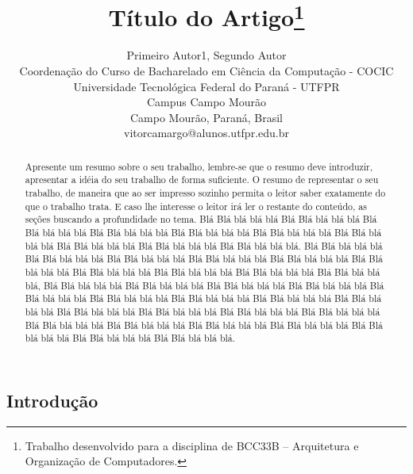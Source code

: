 \documentclass[times, 10pt,twocolumn]{article}
\begin{document}
\begin{savenotes}
\title{Título do Artigo\footnote{Trabalho desenvolvido para a disciplina de BCC33B – Arquitetura e Organização de Computadores.}}


\author{Primeiro Autor1, Segundo Autor\\
Coordenação do Curso de Bacharelado em Ciência da Computação - COCIC\\
Universidade Tecnológica Federal do Paraná - UTFPR\\ 
Campus Campo Mourão\\
Campo Mourão, Paraná, Brasil\\
vitorcamargo@alunos.utfpr.edu.br\\
}

\maketitle
\thispagestyle{empty}

\begin{abstract}
   Apresente um resumo sobre o seu trabalho, lembre-se que o resumo deve introduzir, apresentar a idéia do seu trabalho de forma suficiente. O resumo de representar o seu trabalho, de maneira que ao ser impresso sozinho permita o leitor saber exatamente do que o trabalho trata. E caso lhe interesse o leitor irá ler o restante do conteúdo, as seções buscando a profundidade no tema.
   Blá Blá blá blá blá Blá Blá blá blá blá Blá Blá blá blá blá Blá Blá blá blá blá Blá Blá blá blá blá Blá Blá blá blá blá Blá Blá blá blá blá Blá Blá blá blá blá Blá Blá blá blá blá Blá Blá blá blá blá. Blá Blá blá blá blá Blá Blá blá blá blá Blá Blá blá blá blá Blá Blá blá blá blá Blá Blá blá blá blá Blá Blá blá blá blá Blá Blá blá blá blá Blá Blá blá blá blá Blá Blá blá blá blá Blá Blá blá blá blá, Blá Blá blá blá blá Blá Blá blá blá blá Blá Blá blá blá blá Blá Blá blá blá blá Blá Blá blá blá blá Blá Blá blá blá blá Blá Blá blá blá blá Blá Blá blá blá blá Blá Blá blá blá blá Blá Blá blá blá blá Blá Blá blá blá blá Blá Blá blá blá blá Blá Blá blá blá blá Blá Blá blá blá blá Blá Blá blá blá blá Blá Blá blá blá blá Blá Blá blá blá blá Blá Blá blá blá blá Blá Blá blá blá blá Blá Blá blá blá blá.
\end{abstract}
\section{Introdução} \label{sec_introducao}


\end{savenotes}
\end{document}
